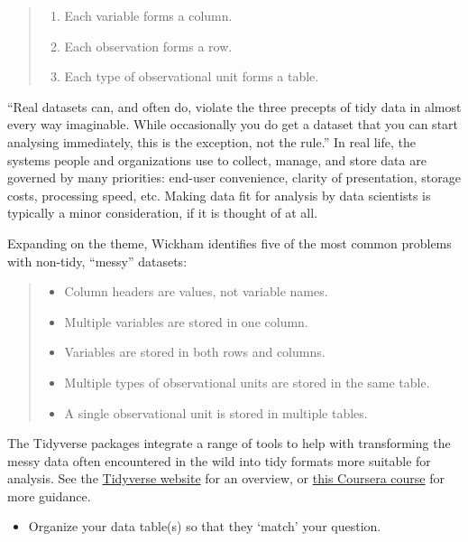 \documentclass[
]{book}
\providecommand{\tightlist}{%
  \setlength{\itemsep}{0pt}\setlength{\parskip}{0pt}}
\begin{document}
\begin{quote}
\begin{enumerate}
\def\labelenumi{\arabic{enumi}.}
\tightlist
\item
  Each variable forms a column.
\item
  Each observation forms a row.
\item
  Each type of observational unit forms a table.
\end{enumerate}
\end{quote}

``Real datasets can, and often do, violate the three precepts of tidy data in almost every way imaginable. While occasionally you do get a dataset that you can start analysing immediately, this is the exception, not the rule.'' In real life, the systems people and organizations use to collect, manage, and store data are governed by many priorities: end-user convenience, clarity of presentation, storage costs, processing speed, etc. Making data fit for analysis by data scientists is typically a minor consideration, if it is thought of at all.

Expanding on the theme, Wickham identifies five of the most common problems with non-tidy, ``messy'' datasets:

\begin{quote}
\begin{itemize}
\tightlist
\item
  Column headers are values, not variable names.
\item
  Multiple variables are stored in one column.
\item
  Variables are stored in both rows and columns.
\item
  Multiple types of observational units are stored in the same table.
\item
  A single observational unit is stored in multiple tables.
\end{itemize}
\end{quote}

The Tidyverse packages integrate a range of tools to help with transforming the messy data often encountered in the wild into tidy formats more suitable for analysis. See the \href{https://www.tidyverse.org/}{Tidyverse website} for an overview, or \href{https://www.coursera.org/specializations/tidyverse-data-science-r}{this Coursera course} for more guidance.

\begin{itemize}
\tightlist
\item
  Organize your data table(s) so that they `match' your question.
\end{itemize}
\end{document}
